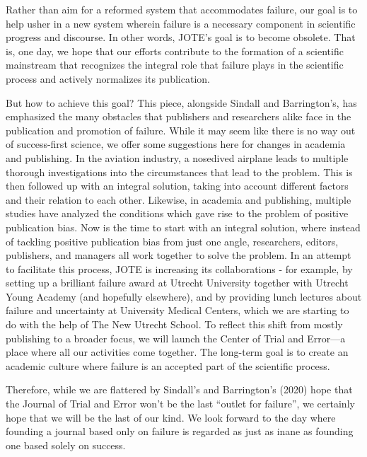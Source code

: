 \documentclass{article}
\begin{document}
Rather than aim for a reformed system that accommodates failure, our goal is to help usher in a new system wherein failure is a necessary component in scientific progress and discourse. In other words, JOTE's goal is to become obsolete. That is, one day, we hope that our efforts contribute to the formation of a scientific mainstream that recognizes the integral role that failure plays in the scientific process and actively normalizes its publication. 

But how to achieve this goal? This piece, alongside Sindall and Barrington's, has emphasized the many obstacles that publishers and researchers alike face in the publication and promotion of failure. While it may seem like there is no way out of success-first science, we offer some suggestions here for changes in academia and publishing. In the aviation industry, a nosedived airplane leads to multiple thorough investigations into the circumstances that lead to the problem. This is then followed up with an integral solution, taking into account different factors and their relation to each other. Likewise, in academia and publishing, multiple studies have analyzed the conditions which gave rise to the problem of positive publication bias. Now is the time to start with an integral solution, where instead of tackling positive publication bias from just one angle, researchers, editors, publishers, and managers all work together to solve the problem. In an attempt to facilitate this process, JOTE is increasing its collaborations - for example, by setting up a brilliant failure award at Utrecht University together with Utrecht Young Academy (and hopefully elsewhere), and by providing lunch lectures about failure and uncertainty at University Medical Centers, which we are starting to do with the help of The New Utrecht School. To reflect this shift from mostly publishing to a broader focus, we will launch the Center of Trial and Error—a place where all our activities come together. The long-term goal is to create an academic culture where failure is an accepted part of the scientific process. 

Therefore, while we are flattered by Sindall's and Barrington's (2020) hope that the Journal of Trial and Error won't be the last “outlet for failure”, we certainly hope that we will be the last of our kind. We look forward to the day where founding a journal based only on failure is regarded as just as inane as founding one based solely on success. 

\section{}
\end{document}
